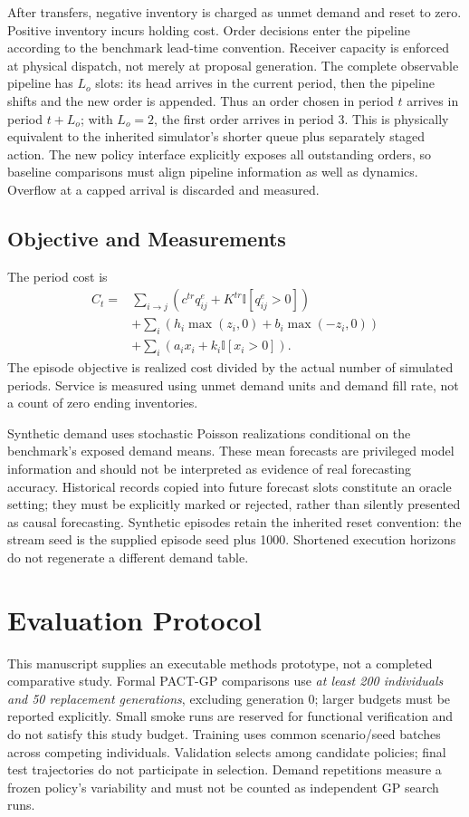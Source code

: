 \documentclass[journal]{IEEEtran}
\begin{document}
After transfers, negative inventory is charged as unmet demand and reset to
zero. Positive inventory incurs holding cost. Order decisions enter the
pipeline according to the benchmark lead-time convention. Receiver capacity
is enforced at physical dispatch, not merely at proposal generation.
The complete observable pipeline has $L_o$ slots: its head arrives in the
current period, then the pipeline shifts and the new order is appended.
Thus an order chosen in period $t$ arrives in period $t+L_o$; with
$L_o=2$, the first order arrives in period 3. This is physically equivalent
to the inherited simulator's shorter queue plus separately staged action.
The new policy interface explicitly exposes all outstanding orders, so
baseline comparisons must align pipeline information as well as dynamics.
Overflow at a capped arrival is discarded and measured.

\subsection{Objective and Measurements}
The period cost is
\begin{align}
 C_t={}&\sum_{i\rightarrow j}
 \left(c^{tr}q^e_{ij}+K^{tr}\mathbb I[q^e_{ij}>0]\right) \nonumber\\
 &+\sum_i\left(h_i\max(z_i,0)+b_i\max(-z_i,0)\right) \nonumber\\
 &+\sum_i\left(a_i x_i+k_i\mathbb I[x_i>0]\right).
\end{align}
The episode objective is realized cost divided by the actual number of
simulated periods. Service is measured using unmet demand units and demand
fill rate, not a count of zero ending inventories.

Synthetic demand uses stochastic Poisson realizations conditional on the
benchmark's exposed demand means. These mean forecasts are privileged model
information and should not be interpreted as evidence of real forecasting
accuracy. Historical records copied into future forecast slots constitute
an oracle setting; they must be explicitly marked or rejected, rather than
silently presented as causal forecasting.
Synthetic episodes retain the inherited reset convention: the stream seed
is the supplied episode seed plus 1000. Shortened execution horizons do not
regenerate a different demand table.



\section{Evaluation Protocol}
\label{sec:evaluation}
This manuscript supplies an executable methods prototype, not a completed
comparative study. Formal PACT-GP comparisons use \emph{at least 200 individuals
and 50 replacement generations}, excluding generation 0; larger budgets must
be reported explicitly. Small smoke runs are reserved for functional
verification and do not satisfy this study budget. Training uses common scenario/seed batches across
competing individuals. Validation selects among candidate policies; final
test trajectories do not participate in selection. Demand repetitions
measure a frozen policy's variability and must not be counted as independent
GP search runs.
\end{document}
